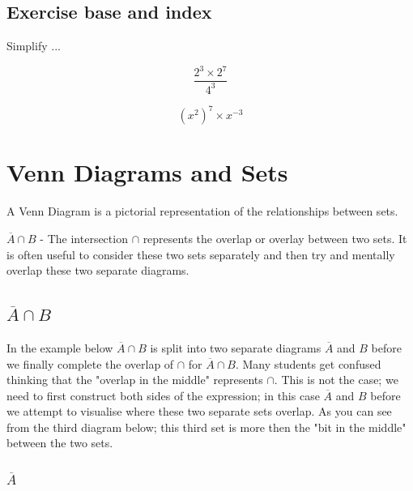 \subsection{Exercise base and index}

Simplify ...

\begin{equation}
  \frac{2^{3} \times 2^{7}}{4^{3}}
\end{equation}

\begin{equation}
  (x^{2})^{7} \times x^{-3}
\end{equation}


\section{Venn Diagrams and Sets}

A Venn Diagram is a pictorial representation of the relationships between sets.

$ \overline{A} \cap B$ - The intersection $\cap$ represents the overlap or overlay between two sets. It is often useful to consider these two sets separately and then try and mentally overlap these two separate diagrams. 

\subsection{$ \overline{A} \cap B$}

In the example below $ \overline{A} \cap B$ is split into two separate diagrams $ \overline{A}$ and $ B$ before we finally complete the overlap of $ \cap$ for $ \overline{A} \cap B$. Many students get confused thinking that the "overlap in the middle" represents $\cap$. This is not the case; we need to first construct both sides of the expression; in this case $ \overline{A} $ and  $B$ before we attempt to visualise where these two separate sets overlap.  As you can see from the third diagram below; this third set is more then the "bit in the middle" between the two sets.

\subsubsection{$ \overline{A}$}


